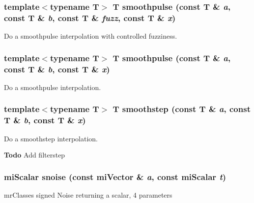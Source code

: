 \subsubsection{\setlength{\rightskip}{0pt plus 5cm}template$<$typename T$>$ T smoothpulse (const T \& {\em a}, const T \& {\em b}, const T \& {\em fuzz}, const T \& {\em x})\hspace{0.3cm}{\tt  [inline]}}\label{namespacersl_a16}


Do a smoothpulse interpolation with controlled fuzziness. 

\subsubsection{\setlength{\rightskip}{0pt plus 5cm}template$<$typename T$>$ T smoothpulse (const T \& {\em a}, const T \& {\em b}, const T \& {\em x})\hspace{0.3cm}{\tt  [inline]}}\label{namespacersl_a15}


Do a smoothpulse interpolation. 

\subsubsection{\setlength{\rightskip}{0pt plus 5cm}template$<$typename T$>$ T smoothstep (const T \& {\em a}, const T \& {\em b}, const T \& {\em x})\hspace{0.3cm}{\tt  [inline]}}\label{namespacersl_a12}


Do a smoothstep interpolation. 

\begin{Desc}
\item[{\bf Todo}]Add filterstep\end{Desc}
\subsubsection{\setlength{\rightskip}{0pt plus 5cm}mi\-Scalar snoise (const mi\-Vector \& {\em a}, const mi\-Scalar {\em t})\hspace{0.3cm}{\tt  [inline]}}\label{namespacersl_a62}


mr\-Classes signed Noise returning a scalar, 4 parameters 

